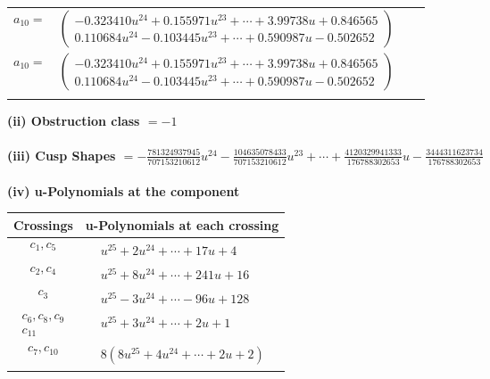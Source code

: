 \documentclass[1p]{elsarticle_modified}
\theoremstyle{definition}
\begin{document}
\begin{tabular}{m{7pt} m{180pt} m{7pt} m{180pt} }
\flushright $a_{10}=$&$\begin{pmatrix}-0.323410 u^{24}+0.155971 u^{23}+\cdots+3.99738 u+0.846565\\0.110684 u^{24}-0.103445 u^{23}+\cdots+0.590987 u-0.502652\end{pmatrix}$\\ \flushright $a_{10}=$&$\begin{pmatrix}-0.323410 u^{24}+0.155971 u^{23}+\cdots+3.99738 u+0.846565\\0.110684 u^{24}-0.103445 u^{23}+\cdots+0.590987 u-0.502652\end{pmatrix}$\\&\end{tabular}
\flushleft \textbf{(ii) Obstruction class $= -1$}\\~\\
\flushleft \textbf{(iii) Cusp Shapes $= -\frac{781324937945}{707153210612} u^{24}-\frac{104635078433}{707153210612} u^{23}+\cdots+\frac{4120329941333}{176788302653} u-\frac{3444311623734}{176788302653}$}\\~\\
\newpage\renewcommand{\arraystretch}{1}
\flushleft \textbf{(iv) u-Polynomials at the component}\newline \\
\begin{tabular}{m{50pt}|m{274pt}}
Crossings & \hspace{64pt}u-Polynomials at each crossing \\
\hline $$\begin{aligned}c_{1},c_{5}\end{aligned}$$&$\begin{aligned}
&u^{25}+2 u^{24}+\cdots+17 u+4
\end{aligned}$\\
\hline $$\begin{aligned}c_{2},c_{4}\end{aligned}$$&$\begin{aligned}
&u^{25}+8 u^{24}+\cdots+241 u+16
\end{aligned}$\\
\hline $$\begin{aligned}c_{3}\end{aligned}$$&$\begin{aligned}
&u^{25}-3 u^{24}+\cdots-96 u+128
\end{aligned}$\\
\hline $$\begin{aligned}c_{6},c_{8},c_{9}\\c_{11}\end{aligned}$$&$\begin{aligned}
&u^{25}+3 u^{24}+\cdots+2 u+1
\end{aligned}$\\
\hline $$\begin{aligned}c_{7},c_{10}\end{aligned}$$&$\begin{aligned}
&8(8 u^{25}+4 u^{24}+\cdots+2 u+2)
\end{aligned}$\\
\hline
\end{tabular}\\~\\
\end{document}
